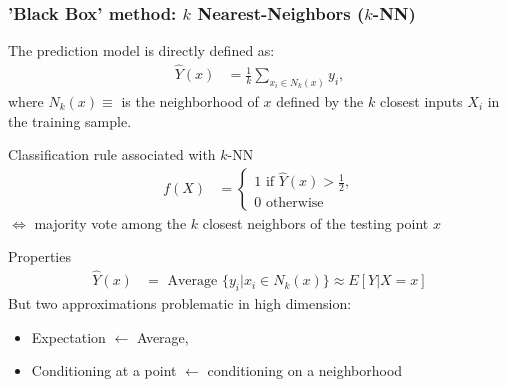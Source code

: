 \documentclass[compress, smaller, serif, 9pt]{beamer}
\begin{document}
\begin{frame}
  \frametitle{'Black Box' method: $k$  Nearest-Neighbors ($k$-NN)}

  The prediction model is directly defined as:
  \begin{align*}
     \widehat{Y}(x) &= \frac{1}{k} \sum_{x_i \in N_k(x) } y_i,
  \end{align*}
  where $N_k(x) \equiv$ is the neighborhood of $x$ defined by the $k$ closest 
  inputs $X_i$ in the training sample.

  \begin{block}{Classification rule associated with $k$-NN}
  \vspace*{-5mm}
  \begin{align*}
     f(X) &= \begin{cases}
                1 \textrm{ if } \widehat{Y}(x) > \frac{1}{2},\\
                0 \textrm{ otherwise}
             \end{cases}
  \end{align*}
  $\Leftrightarrow$ majority vote among the $k$ closest neighbors
  of the testing point $x$
  \end{block}

  \begin{block}{Properties}
  \vspace*{-5mm}
  \begin{align*}
     \hat{Y}(x) &= \textrm{ Average } \{ y_i | x_i \in  N_k(x) \} \approx E[Y | X=x ]
  \end{align*}
  But two approximations problematic in high dimension:
  \begin{itemize}
     \item Expectation $\leftarrow$ Average,
     \item Conditioning at a point  $\leftarrow$ conditioning on a neighborhood
  \end{itemize}

  \end{block}



\end{frame}
\end{document}
